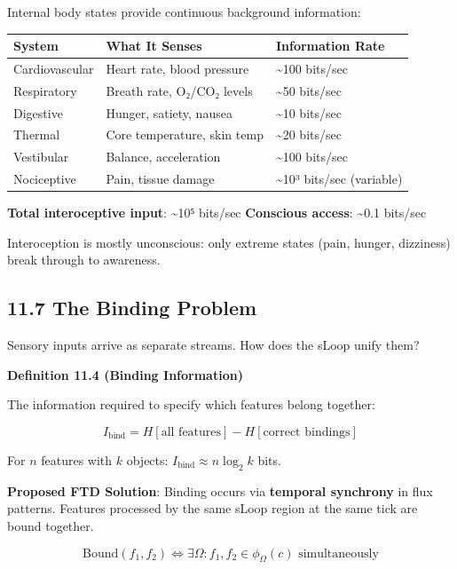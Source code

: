 \documentclass[
  11pt,
  letterpaper,
  twoside,
  openany]{book}
\makeatletter
\let\orig@subsection\subsection
\renewcommand{\subsection}{\needspace{6\baselineskip}\orig@subsection}
\makeatother
\begin{document}
Internal body states provide continuous background information:

\begin{longtable}[]{@{}lll@{}}
\toprule\noalign{}
System & What It Senses & Information Rate \\
\midrule\noalign{}
\endhead
\bottomrule\noalign{}
\endlastfoot
Cardiovascular & Heart rate, blood pressure & \textasciitilde100
bits/sec \\
Respiratory & Breath rate, O₂/CO₂ levels & \textasciitilde50 bits/sec \\
Digestive & Hunger, satiety, nausea & \textasciitilde10 bits/sec \\
Thermal & Core temperature, skin temp & \textasciitilde20 bits/sec \\
Vestibular & Balance, acceleration & \textasciitilde100 bits/sec \\
Nociceptive & Pain, tissue damage & \textasciitilde10³ bits/sec
(variable) \\
\end{longtable}

\textbf{Total interoceptive input}: \textasciitilde10⁵ bits/sec
\textbf{Conscious access}: \textasciitilde0.1 bits/sec

Interoception is mostly unconscious: only extreme states (pain, hunger,
dizziness) break through to awareness.

\subsection{11.7 The Binding Problem}\label{the-binding-problem}

Sensory inputs arrive as separate streams. How does the sLoop unify
them?

\textbf{Definition 11.4 (Binding Information)}

The information required to specify which features belong together:

\[I_{\text{bind}} = H[\text{all features}] - H[\text{correct bindings}]\]

For \(n\) features with \(k\) objects:
\(I_{\text{bind}} \approx n \log_2 k\) bits.

\textbf{Proposed FTD Solution}: Binding occurs via \textbf{temporal
synchrony} in flux patterns. Features processed by the same sLoop region
at the same tick are bound together.

\[\text{Bound}(f_1, f_2) \iff \exists \Omega: f_1, f_2 \in \phi_\Omega(c) \text{ simultaneously}\]
\end{document}
